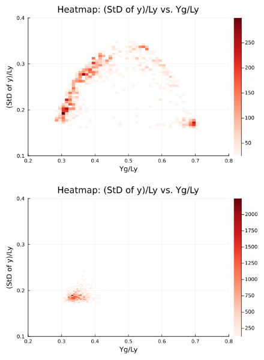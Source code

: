 \begin{figure}[H]
  \centering
  \includegraphics[scale=0.6]{image/RaRtmap_heat/2023-11-15T06:43:21.554__chi1.265_Ay50_rho0.4_T0.43_dT0.04_Rd0.0_Rt0.25_Ra1.877538_g0.0003999718779659611_run4.0e7_output.png}
  \label{}
\end{figure}

\begin{figure}[H]
  \centering
  \includegraphics[scale=0.6]{image/RaRtmap_heat/2023-11-15T07:34:00.555__chi1.265_Ay50_rho0.4_T0.43_dT0.04_Rd0.0_Rt0.375_Ra0.0_g0.0003999718779659611_run4.0e7_output.png}
  \label{}
\end{figure}

